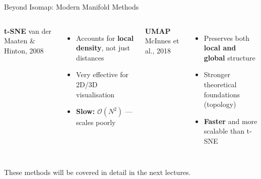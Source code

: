 \documentclass[aspectratio=169,t]{beamer}
\begin{document}
\begin{frame}{Beyond Isomap: Modern Manifold Methods}
  \begin{columns}[T]
    \textcolor{accentred}{\bfseries t-SNE}
    \hfill{\small van der Maaten \& Hinton, 2008}
    \begin{itemize}
      \setlength{\itemsep}{0.25cm}
      \item Accounts for \textbf{local density}, not just distances
      \item Very effective for 2D/3D visualisation
      \item \textbf{Slow:} $\mathcal{O}(N^2)$ --- scales poorly
    \end{itemize}

    \textcolor{accentred}{\bfseries UMAP}
    \hfill{\small McInnes et al., 2018}
    \begin{itemize}
      \setlength{\itemsep}{0.25cm}
      \item Preserves both \textbf{local and global} structure
      \item Stronger theoretical foundations (topology)
      \item \textbf{Faster} and more scalable than t-SNE
    \end{itemize}
  \end{columns}

  \vspace{0.7cm}
  \begin{center}
    {\small These methods will be covered in detail in the next lectures.}
  \end{center}
\end{frame}



\end{document}
